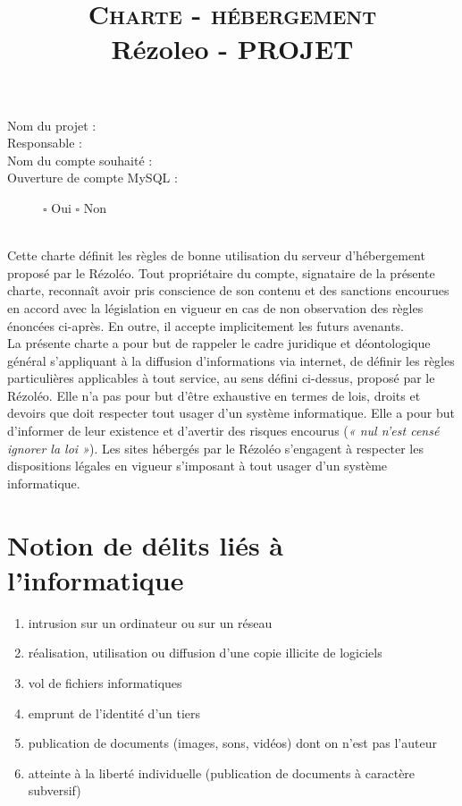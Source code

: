 \documentclass[10pt,a4paper]{article}
\title{{\Huge\textsc{Charte - hébergement}}\\ Rézoleo - PROJET}
\date{}
\begin{document}
\maketitle
\thispagestyle{fancy}


\hrulefill
\begin{description}
\item[Nom du projet :] \dotfill
\item[Responsable :]\dotfill
\item[Nom du compte souhaité :]\dotfill
\item[Ouverture de compte MySQL :] \hspace{1cm} $\square$ Oui \hspace{3cm} $\square$ Non
\end{description}
\hrulefill
\\

Cette charte définit les règles de bonne utilisation du serveur d'hébergement proposé par le Rézoléo. Tout propriétaire du compte, signataire de la présente charte, reconnaît avoir pris conscience de son contenu et des sanctions encourues en accord avec la législation en vigueur en cas de non observation des règles énoncées ci-après. En outre, il accepte implicitement les futurs avenants.\\

La présente charte a pour but de rappeler le cadre juridique et déontologique général s'appliquant à la diffusion d'informations via internet, de définir les règles particulières applicables à tout service, au sens défini ci-dessus, proposé par le Rézoléo. Elle n'a pas pour but d'être exhaustive en termes de lois, droits et devoirs que doit respecter tout usager d'un système informatique. Elle a pour but d'informer de leur existence et d'avertir des risques encourus (\textit{« nul n'est censé ignorer la loi »}). Les sites hébergés par le Rézoléo s'engagent à respecter les dispositions légales en vigueur s'imposant à tout usager d'un système informatique.

\section{Notion de délits liés à l'informatique}
\begin{enumerate}
\item intrusion sur un ordinateur ou sur un réseau
\item réalisation, utilisation ou diffusion d'une copie illicite de logiciels
\item vol de fichiers informatiques
\item emprunt de l'identité d'un tiers
\item publication de documents (images, sons, vidéos) dont on n'est pas l'auteur
\item atteinte à la liberté individuelle (publication de documents à caractère subversif)
\end{enumerate}
\end{document}
